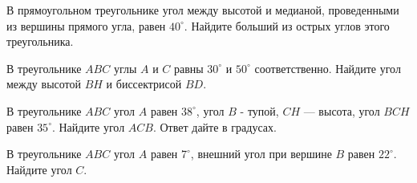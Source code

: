 \begin{homework}[number=1]
	\begin{listofex}
		
		\item В прямоугольном треугольнике угол между высотой и медианой, проведенными из вершины прямого угла, равен \( 40^{\circ} \). Найдите больший из острых углов этого треугольника.
		\item В треугольнике \( ABC \) углы \( A \) и \( C \) равны \( 30^{\circ} \) и \( 50^{\circ} \) соответственно. Найдите угол между высотой \( BH \) и биссектрисой \( BD \).
		\item В треугольнике \( ABC \) угол \( A \) равен \( 38^{\circ} \), угол \( B \) - тупой, \( CH \)  — высота, угол \( BCH \) равен \( 35^{\circ} \). Найдите угол \( ACB \). Ответ дайте в градусах.
		\item В треугольнике \( ABC \) угол \(  A \) равен \( 7^{\circ} \), внешний угол при вершине \( B \) равен \( 22^{\circ} \). Найдите угол \( C \).
	\end{listofex}
\end{homework}


